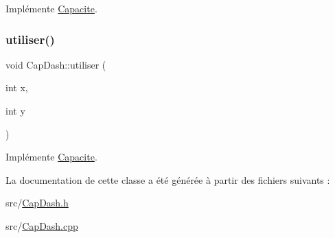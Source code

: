 Implémente \hyperlink{class_capacite_a7d4e86c20cd198960f25c0eb443148fe}{Capacite}.

\mbox{\label{class_cap_dash_ada59ecb62d2c18f6bb6b4acf28a2da93}} 
\subsubsection{\texorpdfstring{utiliser()}{utiliser()}}
{\footnotesize\ttfamily void Cap\+Dash\+::utiliser (\begin{DoxyParamCaption}\item[{int}]{x,  }\item[{int}]{y }\end{DoxyParamCaption})\hspace{0.3cm}{\ttfamily [virtual]}}



Implémente \hyperlink{class_capacite_a4d4f643987fcc2168567bf28a36ea418}{Capacite}.



La documentation de cette classe a été générée à partir des fichiers suivants \+:\begin{DoxyCompactItemize}
\item 
src/\hyperlink{_cap_dash_8h}{Cap\+Dash.\+h}\item 
src/\hyperlink{_cap_dash_8cpp}{Cap\+Dash.\+cpp}\end{DoxyCompactItemize}
